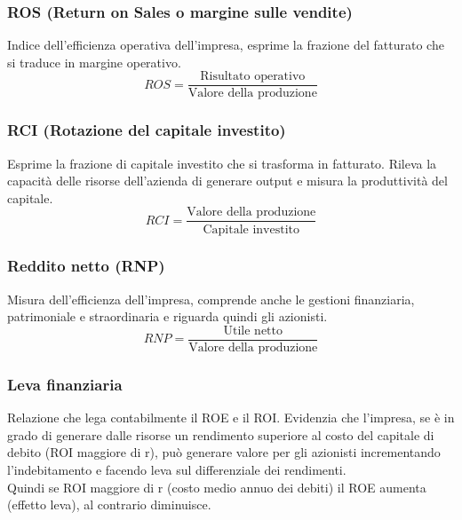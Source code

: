 \documentclass{report}
\begin{document}
	\subsubsection{ROS (Return on Sales o margine sulle vendite)}
	Indice dell'efficienza operativa dell'impresa, esprime la frazione del fatturato che si traduce in margine operativo.
	\[ROS = \frac{\text{Risultato operativo}}{\text{Valore della produzione}}\]
	\subsubsection{RCI (Rotazione del capitale investito)}
	Esprime la frazione di capitale investito che si trasforma in fatturato. Rileva la capacità delle risorse dell'azienda di generare output e misura la produttività del capitale.
	\[RCI = \frac{\text{Valore della produzione}}{\text{Capitale investito}}\]
	\subsubsection{Reddito netto (RNP)}
	Misura dell'efficienza dell'impresa, comprende anche le gestioni finanziaria, patrimoniale e straordinaria e riguarda quindi gli azionisti.
	\[RNP = \frac{\text{Utile netto}}{\text{Valore della produzione}}\]
	\subsubsection{Leva finanziaria}
	Relazione che lega contabilmente il ROE e il ROI. Evidenzia che l'impresa, se è in grado di generare dalle risorse un rendimento superiore al costo del capitale di debito (ROI maggiore di r), può generare valore per gli azionisti incrementando l'indebitamento e facendo leva sul differenziale dei rendimenti.
	\medskip \\Quindi se ROI maggiore di r (costo medio annuo dei debiti) il ROE aumenta (effetto leva), al contrario diminuisce.
	
	
	
	
	
\end{document}
